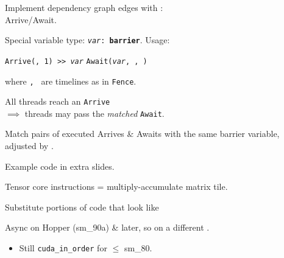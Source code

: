 {\LARGE
Implement dependency graph edges with :\\Arrive/Await.
}

\newpage
{}

{\LARGE
Special variable type: \texttt{\textit{var}: \textbf{barrier}}. Usage:

\hfill \texttt{Arrive(, 1) >> \textit{var}} \hfill \texttt{Await(\textit{var}, , )} \hfill

where \texttt{, } are timelines as in \texttt{Fence}.

\vspace{5mm}

All threads reach an \texttt{Arrive}\\
$\implies$ threads may pass the \textit{matched} \texttt{Await}.

\vspace{5mm}

Match pairs of executed Arrives \& Awaits with the same barrier variable, adjusted by .

\vfill

\hfill Example code in extra slides.

}


\newpage
{}

{\LARGE
Tensor core instructions = multiply-accumulate matrix tile.

Substitute portions of code that look like

}

{\large

}

{\LARGE
Async on Hopper (sm\_90a) \& later, so on a different .
\begin{itemize}
  \item Still \texttt{cuda\_in\_order} for $\le$ sm\_80.
\end{itemize}
}

\newpage
{}

